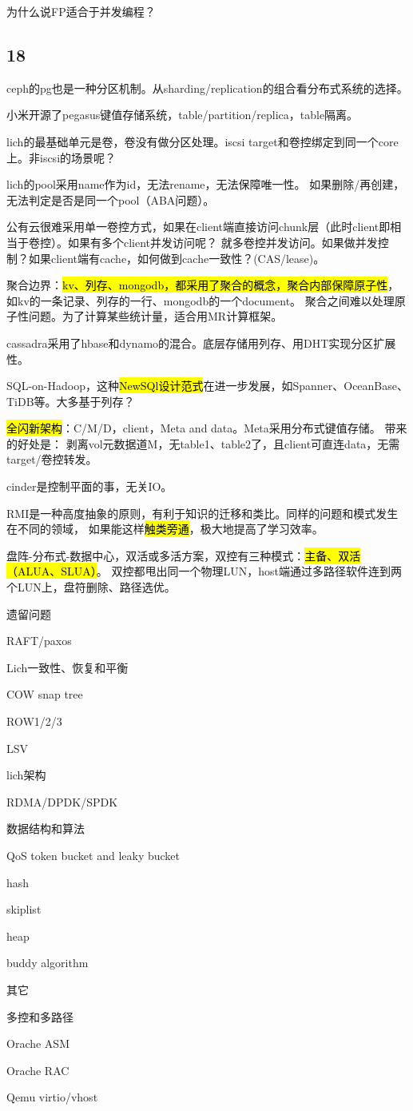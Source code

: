为什么说FP适合于并发编程？

\subsection{18}

ceph的pg也是一种分区机制。从sharding/replication的组合看分布式系统的选择。

小米开源了pegasus键值存储系统，table/partition/replica，table隔离。

lich的最基础单元是卷，卷没有做分区处理。iscsi target和卷控绑定到同一个core上。非iscsi的场景呢？

lich的pool采用name作为id，无法rename，无法保障唯一性。
如果删除/再创建，无法判定是否是同一个pool（ABA问题）。

公有云很难采用单一卷控方式，如果在client端直接访问chunk层（此时client即相当于卷控）。如果有多个client并发访问呢？
就多卷控并发访问。如果做并发控制？如果client端有cache，如何做到cache一致性？(CAS/lease)。

聚合边界：\hl{kv、列存、mongodb，都采用了聚合的概念，聚合内部保障原子性}，如kv的一条记录、列存的一行、mongodb的一个document。
聚合之间难以处理原子性问题。为了计算某些统计量，适合用MR计算框架。

cassadra采用了hbase和dynamo的混合。底层存储用列存、用DHT实现分区扩展性。

SQL-on-Hadoop，这种\hl{NewSQl设计范式}在进一步发展，如Spanner、OceanBase、TiDB等。大多基于列存？

\hl{全闪新架构}：C/M/D，client，Meta and data。Meta采用分布式键值存储。
带来的好处是： 剥离vol元数据道M，无table1、table2了，且client可直连data，无需target/卷控转发。

cinder是控制平面的事，无关IO。

\hrulefill

RMI是一种高度抽象的原则，有利于知识的迁移和类比。同样的问题和模式发生在不同的领域，
如果能这样\hl{触类旁通}，极大地提高了学习效率。

盘阵-分布式-数据中心，双活或多活方案，双控有三种模式：\hl{主备、双活（ALUA、SLUA）}。
双控都甩出同一个物理LUN，host端通过多路径软件连到两个LUN上，盘符删除、路径选优。

\hrulefill

遗留问题
\begin{enumbox}
\item RAFT/paxos
\item Lich一致性、恢复和平衡
\item COW snap tree
\item ROW1/2/3
\item LSV
\item lich架构
\item RDMA/DPDK/SPDK
\end{enumbox}

数据结构和算法
\begin{enumbox}
\item QoS token bucket and leaky bucket
\item hash
\item skiplist
\item heap
\item buddy algorithm
\end{enumbox}

其它
\begin{enumbox}
\item 多控和多路径
\item Orache ASM
\item Orache RAC
\item Qemu virtio/vhost
\end{enumbox}
